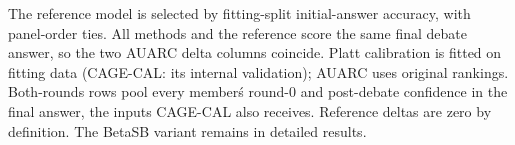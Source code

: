 \begin{table}[t]
{\begin{tabular}{@{}lrrrrrrrrrrrrrrrrrrrr@{}}
\bottomrule
\end{tabular}%
}
\vspace{2pt}
\parbox{\textwidth}{\footnotesize The reference model is selected by fitting-split initial-answer accuracy, with panel-order ties. All methods and the reference score the same final debate answer, so the two AUARC delta columns coincide. Platt calibration is fitted on fitting data (CAGE-CAL: its internal validation); AUARC uses original rankings. Both-rounds rows pool every member\'s round-0 and post-debate confidence in the final answer, the inputs CAGE-CAL also receives. Reference deltas are zero by definition. The BetaSB variant remains in detailed results.}
\end{table}
